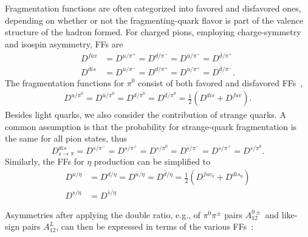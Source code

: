 Fragmentation functions are often categorized into favored and disfavored ones, depending on whether or not the fragmenting-quark flavor is part of the valence structure of the hadron formed. For charged pions, employing charge-symmetry and isospin asymmetry, FFs are 
\begin{equation}
\begin{aligned}
D^{fav}&=D^{u/{\pi^+}}=D^{d/{\pi^-}}=D^{\bar{u}/{\pi^-}}=D^{\bar{d}/{\pi^+}}\\
D^{dis}&=D^{u/{\pi^-}}=D^{d/{\pi^+}}=D^{\bar{u}/{\pi^+}}=D^{\bar{d}/{\pi^-}}.
\label{eqn:FF4}
\end{aligned}
\end{equation}
The fragmentation functions for $\pi^0$ consist of both favored and disfavored FFs~\cite{FoundationsofpQCD,Efremov:2006qm},
\begin{equation}
\begin{aligned}
D^{u/{\pi^0}}=D^{\bar{u}/{\pi^0}}=D^{d/{\pi^0}}=D^{\bar{d}/{\pi^0}}=\frac{1}{2}(D^{dis}+D^{fav}).
\label{eqn:FF4pi0}
\end{aligned}
\end{equation}
Besides light quarks, we also consider the contribution of strange quarks.
A common assumption is that the probability for strange-quark fragmentation is the same for all pion states, thus
\begin{equation}
D^{dis}_{s\rightarrow\pi}=D^{s/{\pi^-}}=D^{s/{\pi^+}}=D^{s/{\pi^0}}=D^{\bar{s}/{\pi^-}}=D^{\bar{s}/{\pi^+}}=D^{\bar{s}/{\pi^0}}.
\end{equation}
%
Similarly, the FFs for $\eta$ production can be simplified to 
%
\begin{equation}
\begin{aligned}
D^{u/{\eta}}&=D^{d/{\eta}}=D^{\bar{u}/{\eta}}=D^{\bar{d}/{\eta}}=\frac{1}{2}\left(D^{fav_\eta}+D^{dis_\eta}\right) \\
D^{s/{\eta}}&=D^{\bar{s}/{\eta}}
\label{eqn:FFetaquark}
\end{aligned}
\end{equation}

 
Asymmetries after applying the double ratio, e.g., of  $\pi^0\pi^{\pm}$ pairs $A^{0\pm}_{12}$ and like-sign pairs $A^L_{12}$, can then be expressed in terms of the various FFs~\cite{Efremov:2006qm}:

